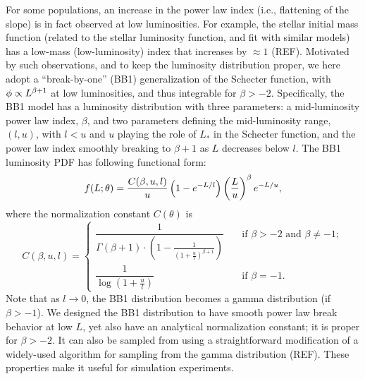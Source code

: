 
For some populations, an increase in the power law index (i.e., flattening of the slope) is in fact observed at low luminosities.
For example, the stellar initial mass function (related to the stellar luminosity function, and fit with similar models) has a low-mass (low-luminosity) index that increases by $\approx 1$ (REF).
Motivated by such observations, and to keep the luminosity distribution proper, we here adopt a ``break-by-one'' (BB1) generalization of the Schecter function, with $\phi \propto L^{\beta+1}$ at low luminosities, and thus integrable for $\beta > -2$.
Specifically, the BB1 model has a luminosity distribution with three parameters: a mid-luminosity power law index, $\beta$, and two parameters defining the mid-luminosity range, $(l, u)$, with $l < u$ and  $u$ playing the role of $L_*$ in the Schecter function, and the power law index smoothly breaking to $\beta+1$ as $L$ decreases below $l$.
The BB1 luminosity PDF has following functional form:
\begin{equation}
\label{eq:lumPDF} 
f(L ; \theta) = 
  \frac{C(\beta,u,l)}{u}\left(1-e^{-L/l}\right) \left(\frac{L}{u}\right)^{\beta} e^{-L/u},
\end{equation}
where the normalization constant $C(\theta)$ is
\begin{equation}
\label{eq:normLumPDF} 
C(\beta,u,l) =
  \begin{cases} \dfrac{1}{\Gamma(\beta+1)\cdot\left(1-\frac{1}{\left(1+\frac{u}{l}\right)^{\beta+1}}\right)} 
    & \quad \text{if } \beta > -2\text{ and }\beta \ne -1; \\
 \dfrac{1}{\log\left(1+\frac{u}{l}\right)} & \quad \text{if } \beta=-1.
  \end{cases}
\end{equation} 
Note that as $l\rightarrow 0$, the BB1 distribution becomes a gamma distribution (if $\beta > -1$).
We designed the BB1 distribution to have smooth power law break behavior at low $L$, yet also have an analytical normalization constant;
it is proper for $\beta > -2$.
It can also be sampled from using a straightforward modification of a widely-used algorithm for sampling from the gamma distribution (REF).
These properties make it useful for simulation experiments.

